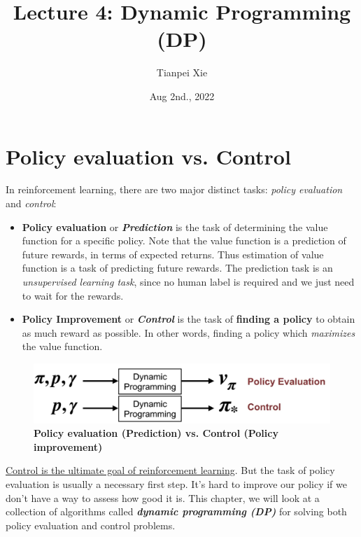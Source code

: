 \documentclass[11pt]{article}
\begin{document}
\title{Lecture 4: Dynamic Programming (DP)}
\author{Tianpei Xie}
\date{ Aug 2nd., 2022 }
\maketitle
\tableofcontents
\newpage
\section{Policy evaluation vs. Control}
In reinforcement learning, there are two major distinct tasks: \emph{policy evaluation} and \emph{control}:
\begin{itemize}
\item \textbf{Policy evaluation} or \textbf{\emph{Prediction}} is the task of determining the value function for a specific policy. Note that the value function is a prediction of future rewards, in terms of expected returns. Thus estimation of value function is a task of predicting future rewards. The prediction task is an \emph{unsupervised learning task}, since no human label is required and we just need to wait for the rewards. 

\item \textbf{Policy Improvement} or \textbf{\emph{Control}}  is the task of \textbf{finding a policy} to obtain as much reward as possible. In other words, finding a policy which \emph{maximizes} the value function.
\end{itemize}
\begin{figure}
\begin{minipage}[t]{1\linewidth}
  \centering
  \centerline{\includegraphics[scale = 0.3]{policy_evaluation_control.png}}
\end{minipage}
\caption{\footnotesize{\textbf{Policy evaluation (Prediction) vs. Control (Policy improvement)}}}
\label{fig: policy_evaluation_control}
\end{figure}


\underline{Control is the ultimate goal of reinforcement learning}. But the task of policy evaluation is usually a necessary first step. It's hard to improve our policy if we don't have a way to assess how good it is. This chapter, we will look at a collection of algorithms called \emph{\textbf{dynamic programming (DP)}} for solving both policy evaluation and control problems.
\end{document}
